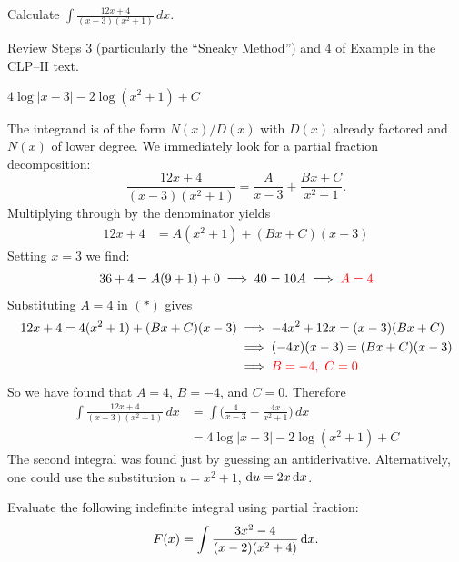 \begin{Mquestion}[2016A]
Calculate $\displaystyle \int \frac{12x+4}{(x-3)(x^2+1)}\,dx$.
\end{Mquestion}

\begin{hint}
Review Steps 3 (particularly the ``Sneaky Method'') and 4 of
Example  in the CLP--II text.
\end{hint}

\begin{answer}
$4 \log |x-3| - 2 \log (x^2 + 1) + C$
\end{answer}

\begin{solution}
The integrand is of the form $N(x)/D(x)$ with $D(x)$ already factored
and $N(x)$ of lower degree. We immediately look for a partial fraction decomposition:
\begin{equation*}
\frac{12x+4}{(x-3)(x^2+1)} = \frac{A}{x-3} + \frac{Bx+C}{x^2+1}.
\end{equation*}
Multiplying through by the denominator yields
\begin{align}
12x+4 &= A(x^2+1) + (Bx+C)(x-3)
\tag{$*$}
\end{align}
Setting $x=3$ we find:
\begin{align*}
   36 +4 = A(9 + 1) + 0 \implies 40 =10A  \implies \color{red}A = 4
\end{align*}
Substituting $A=4$ in $(*)$ gives
\begin{align*}
12x+4 = 4(x^2+1) + (Bx+C)(x-3)
  &\implies   -4x^2+12 x =(x-3)(Bx + C) \\
  &\implies   (-4x)(x-3)=(Bx + C)(x-3) \\
  & \implies  \color{red}B=-4,~C=0
\end{align*}
So we have found that $A=4$, $B=-4$, and $C=0$. Therefore
\begin{align*}
  \int \frac{12x+4}{(x-3)(x^2+1)} \,dx &= \int \bigg( \frac{4}{x-3} - \frac{4x}{x^2+1} \bigg) \,dx \\
   &=  4 \log |x-3| - 2 \log (x^2 + 1) + C
\end{align*}
The second integral was found just by guessing an antiderivative.
Alternatively, one could use the substitution $u=x^2+1$, $\mathrm{d}u=2x\,\mathrm{d}x$.
\end{solution}


\begin{question}[2016Q4]
Evaluate the following indefinite integral using partial fraction:
\begin{align*}
F(x) = \int \frac{3x^2 -4}{(x-2)(x^2+4)}\,\mathrm{d}x .
\end{align*}
\end{question}


